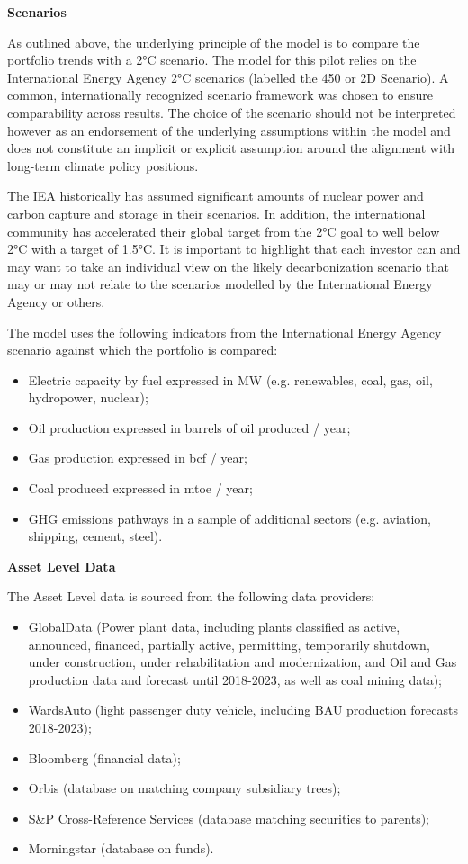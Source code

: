 \documentclass[10pt,table,a4]{article}\usepackage[]{graphicx}\usepackage[]{color}
\begin{document}
		\begin{multicols}{2}
					\textbf{Scenarios}
			
			As outlined above, the underlying principle of the model is to compare the portfolio trends with a 2°C scenario. The model for this pilot relies on the International Energy Agency 2°C scenarios (labelled the 450 or 2D Scenario). A common, internationally recognized scenario framework was chosen to ensure comparability across results. The choice of the scenario should not be interpreted however as an endorsement of the underlying assumptions within the model and does not constitute an implicit or explicit assumption around the alignment with long-term climate policy positions. 
			
			The IEA historically has assumed significant amounts of nuclear power and carbon capture and storage in their scenarios. In addition, the international community has accelerated their global target from the 2°C goal to well below 2°C with a target of 1.5°C. It is important to highlight that each investor can and may want to take an individual view on the likely decarbonization scenario that may or may not relate to the scenarios modelled by the International Energy Agency or others.
			
			The model uses the following indicators from the International Energy Agency scenario against which the portfolio is compared:
			\begin{itemize}
				\item{Electric capacity by fuel expressed in MW (e.g. renewables, coal, gas, oil, hydropower, nuclear);}
				\item{Oil production expressed in barrels of oil produced / year;}
				\item{Gas production expressed in bcf / year;}
				\item{Coal produced expressed in mtoe / year;}
				\item{GHG emissions pathways in a sample of additional sectors (e.g. aviation, shipping, cement, steel).}
			\end{itemize}
			
			
			\textbf{Asset Level Data}
			
			The Asset Level data is sourced from the following data providers: 
			\begin{itemize}
				\item{GlobalData (Power plant data, including plants classified as active, announced, financed, partially active, permitting, temporarily shutdown, under construction, under rehabilitation and modernization, and Oil and Gas production data and forecast until 2018-2023, as well as coal mining data); }
				\item{WardsAuto (light passenger duty vehicle, including BAU production forecasts 2018-2023); }
				\item{Bloomberg (financial data);}
				\item{Orbis (database on matching company subsidiary trees);}
				\item{S\&P Cross-Reference Services (database matching securities to parents);}
				\item{Morningstar (database on funds). }
				

\end{itemize}
\end{multicols}
\end{document}
